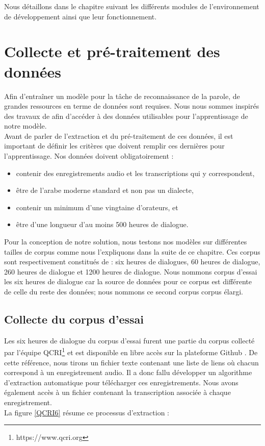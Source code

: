 Nous détaillons dans le chapitre suivant les différents modules de l'environnement de développement ainsi que leur fonctionnement.


\section{Collecte et pré-traitement des données}
Afin d'entraîner un modèle pour la tâche de reconnaissance de la parole, de grandes ressources en terme de données sont requises. Nous nous sommes inspirés des travaux de \cite{e2earabiclexiconfree} afin d'accéder à des données utilisables pour l'apprentissage de notre modèle.\\
Avant de parler de l'extraction et du pré-traitement de ces données, il est important de définir les critères \cite{towardse2esr} que doivent remplir ces dernières pour l'apprentissage. Nos données doivent obligatoirement : 
\begin{itemize}
    \item contenir des enregistrements audio et les transcriptions qui y correspondent,
    \item être de l'arabe moderne standard et non pas un dialecte,
    \item contenir un minimum d'une vingtaine d'orateurs, et
    \item être d'une longueur d'au moins 500 heures de dialogue. \\
\end{itemize}

Pour la conception de notre solution, nous testons nos modèles sur différentes tailles de corpus comme nous l'expliquons dans la suite de ce chapitre. Ces corpus sont respectivement constitués de : six heures de dialogues, 60 heures de dialogue, 260 heures de dialogue et 1200 heures de dialogue. Nous nommons corpus d'essai les six heures de dialogue car la source de données pour ce corpus est différente de celle du reste des données; nous nommons ce second corpus corpus élargi. 

\subsection{Collecte du corpus d'essai}\label{corpus_essais}
Les six heures de dialogue du corpus d'essai furent une partie du corpus collecté par l'équipe QCRI\footnote{https://www.qcri.org} et est disponible en libre accès sur la plateforme Github \cite{qcri6}. De cette référence, nous tirons un fichier texte contenant une liste de liens où chacun correspond à un enregistrement audio. Il a donc fallu développer un algorithme d'extraction automatique pour télécharger ces enregistrements. Nous avons également accès à un fichier contenant la transcription associée à chaque enregistrement. \\
La figure \ref{QCRI6} résume ce processus d'extraction :

